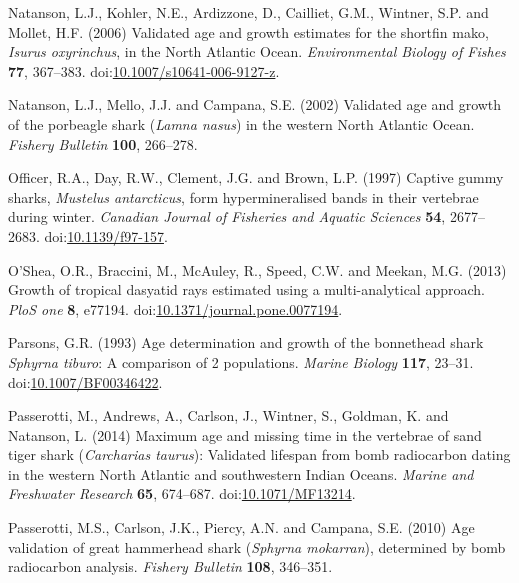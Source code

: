 \documentclass[]{article}
\begin{document}
\hypertarget{ref-natanson_validated_2006}{}
Natanson, L.J., Kohler, N.E., Ardizzone, D., Cailliet, G.M., Wintner,
S.P. and Mollet, H.F. (2006) Validated age and growth estimates for the
shortfin mako, \emph{Isurus oxyrinchus}, in the North Atlantic Ocean.
\emph{Environmental Biology of Fishes} \textbf{77}, 367--383.
doi:\href{https://doi.org/10.1007/s10641-006-9127-z}{10.1007/s10641-006-9127-z}.

\hypertarget{ref-natanson_validated_2002}{}
Natanson, L.J., Mello, J.J. and Campana, S.E. (2002) Validated age and
growth of the porbeagle shark (\emph{Lamna nasus}) in the western North
Atlantic Ocean. \emph{Fishery Bulletin} \textbf{100}, 266--278.

\hypertarget{ref-officer_captive_1997}{}
Officer, R.A., Day, R.W., Clement, J.G. and Brown, L.P. (1997) Captive
gummy sharks, \emph{Mustelus antarcticus}, form hypermineralised bands
in their vertebrae during winter. \emph{Canadian Journal of Fisheries
and Aquatic Sciences} \textbf{54}, 2677--2683.
doi:\href{https://doi.org/10.1139/f97-157}{10.1139/f97-157}.

\hypertarget{ref-oshea_growth_2013}{}
O'Shea, O.R., Braccini, M., McAuley, R., Speed, C.W. and Meekan, M.G.
(2013) Growth of tropical dasyatid rays estimated using a
multi-analytical approach. \emph{PloS one} \textbf{8}, e77194.
doi:\href{https://doi.org/10.1371/journal.pone.0077194}{10.1371/journal.pone.0077194}.

\hypertarget{ref-parsons_age_1993}{}
Parsons, G.R. (1993) Age determination and growth of the bonnethead
shark \emph{Sphyrna tiburo}: A comparison of 2 populations. \emph{Marine
Biology} \textbf{117}, 23--31.
doi:\href{https://doi.org/10.1007/BF00346422}{10.1007/BF00346422}.

\hypertarget{ref-passerotti_maximum_2014}{}
Passerotti, M., Andrews, A., Carlson, J., Wintner, S., Goldman, K. and
Natanson, L. (2014) Maximum age and missing time in the vertebrae of
sand tiger shark (\emph{Carcharias taurus}): Validated lifespan from
bomb radiocarbon dating in the western North Atlantic and southwestern
Indian Oceans. \emph{Marine and Freshwater Research} \textbf{65},
674--687. doi:\href{https://doi.org/10.1071/MF13214}{10.1071/MF13214}.

\hypertarget{ref-passerotti_age_2010}{}
Passerotti, M.S., Carlson, J.K., Piercy, A.N. and Campana, S.E. (2010)
Age validation of great hammerhead shark (\emph{Sphyrna mokarran}),
determined by bomb radiocarbon analysis. \emph{Fishery Bulletin}
\textbf{108}, 346--351.
\end{document}
